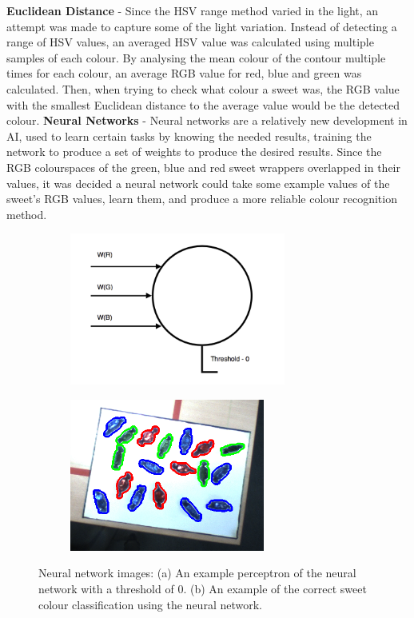 \textbf{Euclidean Distance} - Since the HSV range method varied in the light, an attempt was made to capture some of the light variation. Instead of detecting a range of HSV values, an averaged HSV value was calculated using multiple samples of each colour. By analysing the mean colour of the contour multiple times for each colour, an average RGB value for red, blue and green was calculated. Then, when trying to check what colour a sweet was, the RGB value with the smallest Euclidean distance to the average  value would be the detected colour.
\newline\newline
\textbf{Neural Networks} - Neural networks are a relatively new development in AI, used to learn certain tasks by knowing the needed results, training the network to produce a set of weights to produce the desired results. Since the RGB colourspaces of the green, blue and red sweet wrappers overlapped in their values, it was decided a neural network could take some example values of the sweet's RGB values, learn them, and produce a more reliable colour recognition method.
\begin{figure}[H]
    \captionsetup[subfigure]{justification=centering}
    \begin{subfigure}[H]{0.475\textwidth}   
        \centering 
        \caption{}
        \includegraphics[width=\textwidth, height=5cm]{neural.png}
        \label{fig:perceptron}
    \end{subfigure}
    \begin{subfigure}[H]{0.475\textwidth}   
        \centering 
        \caption{}
        \includegraphics[width=\textwidth, height=5cm]{correctneuralimage.png}
        \label{fig:workingneural}
    \end{subfigure}
    \vspace{-0.5cm}
    \caption{Neural network images: (a) An example perceptron of the neural network with a threshold of 0. (b) An example of the correct sweet colour classification using the neural network.}
\end{figure}
